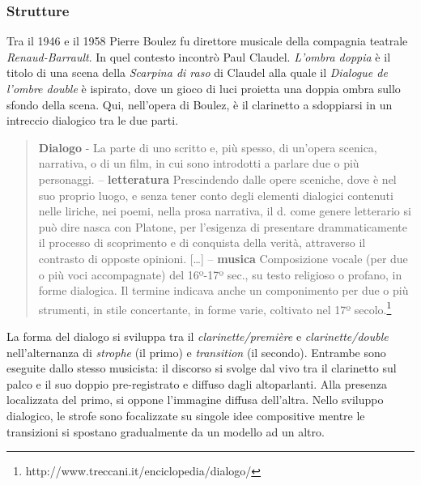 
\subsubsection*{Strutture}


Tra il 1946 e il 1958 Pierre Boulez fu direttore musicale della compagnia teatrale \emph{Renaud-Barrault}. In quel contesto incontrò Paul Claudel. \emph{L’ombra doppia} è il titolo di una scena della \emph{Scarpina di raso} di Claudel alla quale il \emph{Dialogue de l'ombre double} è ispirato, dove un gioco di luci proietta una doppia ombra sullo sfondo della scena. Qui, nell'opera di Boulez, è il clarinetto a sdoppiarsi in un intreccio dialogico tra le due parti.

\begin{quote}
{\small
\textbf{Dialogo} - La parte di uno scritto e, più spesso, di un’opera scenica, narrativa, o di un film, in cui sono introdotti a parlare due o più personaggi. -- \textbf{letteratura} Prescindendo dalle opere sceniche, dove è nel suo proprio luogo, e senza tener conto degli elementi dialogici contenuti nelle liriche, nei poemi, nella prosa narrativa, il d. come genere letterario si può dire nasca con Platone, per l’esigenza di presentare drammaticamente il processo di scoprimento e di conquista della verità, attraverso il contrasto di opposte opinioni. [\ldots] -- \textbf{musica} Composizione vocale (per due o più voci accompagnate) del 16º-17º sec., su testo religioso o profano, in forme dialogica. Il termine indicava anche un componimento per due o più strumenti, in stile concertante, in forme varie, coltivato nel 17º secolo.\footnote{http://www.treccani.it/enciclopedia/dialogo/}}
\end{quote}

La forma del dialogo si sviluppa tra il \emph{clarinette/première} e \emph{clarinette/double} nell'alternanza di \emph{strophe} (il primo) e \emph{transition} (il secondo). Entrambe sono eseguite dallo stesso musicista: il discorso si svolge dal vivo tra il clarinetto sul palco e il suo doppio pre-registrato e diffuso dagli altoparlanti. Alla presenza localizzata del primo, si oppone l'immagine diffusa dell'altra. Nello sviluppo dialogico, le strofe sono focalizzate su singole idee compositive mentre le transizioni si spostano gradualmente da un modello ad un altro.

